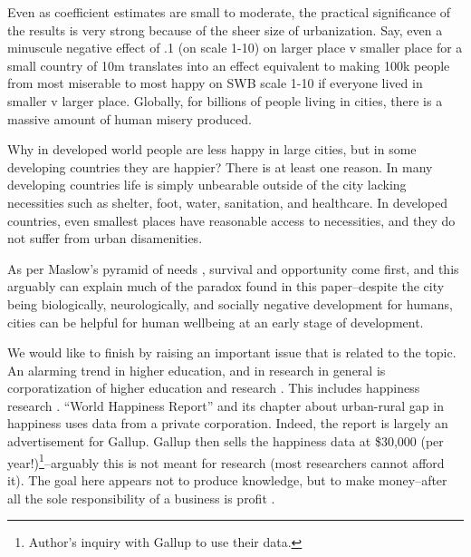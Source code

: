 \documentclass[10pt, letterpaper]{article}
\begin{document}
Even as coefficient estimates are small to moderate, the practical significance
of the results is very strong because of the sheer size of urbanization. 
%
Say, even a minuscule negative effect of .1 (on scale 1-10) on larger place v
smaller place for a small country
of 10m translates into an effect equivalent to making 100k people from most
miserable to most happy on SWB scale 1-10 if everyone lived in smaller v larger place. %
 Globally, for billions of people living in cities, there is a massive amount of
 human misery produced. 

Why in developed world people are less happy in large cities, but in some
developing countries they are happier? There is at least one reason. In many
developing countries life is simply unbearable outside of the city lacking
necessities such as shelter, foot, water, sanitation, and healthcare. In
developed countries, even smallest places have reasonable access to necessities,
and they do not suffer from urban disamenities. %
 
As per Maslow's pyramid of needs \citep{maslow87}, survival and opportunity
come first, and this arguably can explain much of the paradox found in this
paper--despite the city being biologically, neurologically, and socially negative
development for humans, cities can be helpful for human wellbeing at an early stage of development. 


We would like to finish by raising an important issue that is related to the topic. 
An alarming trend in higher education, and in research in general is
corporatization of higher education and research \citep{mills2012corporatization,cox2013corporatization,millsNYT12fa,CatropaNYT20feb8,schmidlinNYT15oct10}. This includes happiness
research \citep{davies15}. ``World Happiness Report'' \citep{helliwell20} and its chapter about urban-rural gap in
happiness \citep{burger20} uses data from a private corporation. Indeed, the
report %
 is
 largely an advertisement for Gallup. Gallup then sells the happiness data at
\$30,000 (per year!)\footnote{Author's inquiry with Gallup to use their data.}--arguably this is
not meant for research (most researchers cannot afford it). The goal here
appears not to produce knowledge, but to make money--after all the sole
responsibility of a business is  profit \citep{friedman70}.
\end{document}
